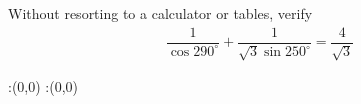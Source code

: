 
%
%
%
%
% 
% 

\question[5] Without resorting to a calculator or tables, verify
\begin{align}
  \dfrac{1}{\cos 290^\circ}+\dfrac{1}{\sqrt{3}\sin 250^\circ} 
    = \dfrac{4}{\sqrt{3}} \nonumber
\end{align}


\ifprintanswers
  \begin{marginfigure}
      :(0,0)
      :(0,0)
    \figdrawbegin{}
      \figdrawline [100,101]
    \figdrawend
    \figvisu{\figBoxA}{}{%
    }
    \centerline{\box\figBoxA}
  \end{marginfigure}
\fi 


